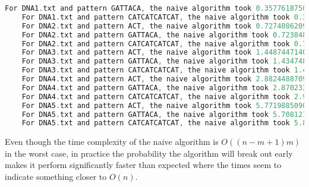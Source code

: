 \documentclass[12pt]{article}
\newenvironment{problem}[2][Problem]{\begin{trivlist}
\item[\hskip \labelsep {\bfseries #1}\hskip \labelsep {\bfseries #2.}]}{\end{trivlist}}
\begin{document}
\begin{problem}{1}
\begin{lstlisting}[language=C, caption=Terminal output running code]
    For DNA1.txt and pattern GATTACA, the naive algorithm took 0.3577618750023248 seconds with 242 matches
    For DNA1.txt and pattern CATCATCATCAT, the naive algorithm took 0.3621113970002625 seconds with 0 matches
    For DNA2.txt and pattern ACT, the naive algorithm took 0.727408620998176 seconds with 131034 matches
    For DNA2.txt and pattern GATTACA, the naive algorithm took 0.7238480179985345 seconds with 491 matches
    For DNA2.txt and pattern CATCATCATCAT, the naive algorithm took 0.7162508259971219 seconds with 1 matches
    For DNA3.txt and pattern ACT, the naive algorithm took 1.4487447140018048 seconds with 262192 matches
    For DNA3.txt and pattern GATTACA, the naive algorithm took 1.4347486420010682 seconds with 1002 matches
    For DNA3.txt and pattern CATCATCATCAT, the naive algorithm took 1.4541748980009288 seconds with 1 matches
    For DNA4.txt and pattern ACT, the naive algorithm took 2.882448870997905 seconds with 524454 matches
    For DNA4.txt and pattern GATTACA, the naive algorithm took 2.870233528999961 seconds with 1976 matches
    For DNA4.txt and pattern CATCATCATCAT, the naive algorithm took 2.910066188000201 seconds with 5 matches
    For DNA5.txt and pattern ACT, the naive algorithm took 5.771988509000948 seconds with 1050689 matches
    For DNA5.txt and pattern GATTACA, the naive algorithm took 5.708121202998882 seconds with 4161 matches
    For DNA5.txt and pattern CATCATCATCAT, the naive algorithm took 5.878649592999864 seconds with 3 matches
\end{lstlisting}
Even though the time complexity of the naive algorithm is $O((n-m+1)m)$ in the worst case, in practice the probability the algorithm will break out early makes it perform significantly faster than expected where the times seem to indicate something closer to $O(n)$.
\end{problem}
\pagebreak
\end{document}

